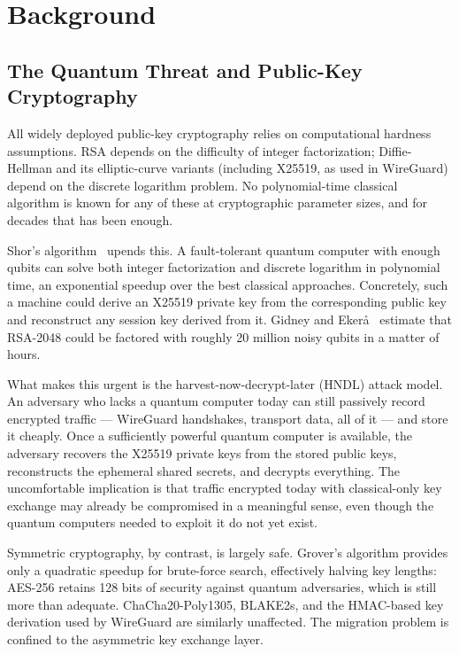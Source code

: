 \chapter{Background}
\label{chap:background}

\section{The Quantum Threat and Public-Key Cryptography}

All widely deployed public-key cryptography relies on computational hardness assumptions. RSA depends on the difficulty of integer factorization; Diffie-Hellman and its elliptic-curve variants (including X25519, as used in WireGuard) depend on the discrete logarithm problem. No polynomial-time classical algorithm is known for any of these at cryptographic parameter sizes, and for decades that has been enough.

Shor's algorithm~\cite{shor1994algorithms} upends this. A fault-tolerant quantum computer with enough qubits can solve both integer factorization and discrete logarithm in polynomial time, an exponential speedup over the best classical approaches. Concretely, such a machine could derive an X25519 private key from the corresponding public key and reconstruct any session key derived from it. Gidney and Eker\aa~\cite{gidney2021factor} estimate that RSA-2048 could be factored with roughly 20 million noisy qubits in a matter of hours.

What makes this urgent is the harvest-now-decrypt-later (HNDL) attack model. An adversary who lacks a quantum computer today can still passively record encrypted traffic --- WireGuard handshakes, transport data, all of it --- and store it cheaply. Once a sufficiently powerful quantum computer is available, the adversary recovers the X25519 private keys from the stored public keys, reconstructs the ephemeral shared secrets, and decrypts everything. The uncomfortable implication is that traffic encrypted today with classical-only key exchange may already be compromised in a meaningful sense, even though the quantum computers needed to exploit it do not yet exist.

Symmetric cryptography, by contrast, is largely safe. Grover's algorithm provides only a quadratic speedup for brute-force search, effectively halving key lengths: AES-256 retains 128 bits of security against quantum adversaries, which is still more than adequate. ChaCha20-Poly1305, BLAKE2s, and the HMAC-based key derivation used by WireGuard are similarly unaffected. The migration problem is confined to the asymmetric key exchange layer.

